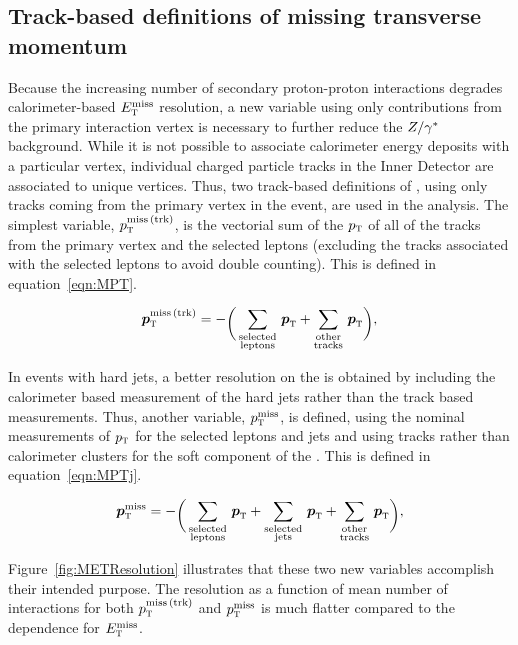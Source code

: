 \subsection{Track-based definitions of missing transverse momentum}

Because the increasing number of secondary proton-proton interactions degrades calorimeter-based $E_{\textrm{\footnotesize\sc t}}^{\rm miss}$ resolution, a new variable using only contributions from the primary interaction vertex is necessary to further reduce the $Z/\gamma^{\ast}$ background. While it is not possible to associate calorimeter energy deposits with a particular vertex, individual charged particle tracks in the Inner Detector are associated to unique vertices. Thus, two track-based definitions of \met, using only tracks coming from the primary vertex in the event, are used in the analysis. The simplest variable, $p_{\textrm{\footnotesize\sc t}}^{\rm miss\,(trk)}$, is the vectorial sum of the $p_{\textrm{\footnotesize\sc t}}$ of all of the tracks from the primary vertex and the selected leptons (excluding the tracks associated with the selected leptons to avoid double counting). This is defined in equation~\ref{eqn:MPT}.

\begin{equation}
\vMPT = -\raisebox{-3.0pt}{\bigg(}%
     \displaystyle
     \sum_{\substack{\rm selected \\ \rm leptons}}\,\vpT
   + \sum_{\substack{\rm other \\ \rm tracks}}\,\vpT
   \raisebox{-3.0pt}{\bigg)},
\label{eqn:MPT}
\end{equation} 

In events with hard jets, a better resolution on the \met is obtained by including the calorimeter based measurement of the hard jets rather than the track based measurements. Thus, another variable, $p_{\textrm{\footnotesize\sc t}}^{\rm miss}$, is defined, using the nominal measurements of $p_{\textrm{\footnotesize\sc t}}$ for the selected leptons and jets and using tracks rather than calorimeter clusters for the soft component of the \met. This is defined in equation~\ref{eqn:MPTj}.

\begin{equation}
\vMPTj = -\raisebox{-3.0pt}{\bigg(}%
     \displaystyle
     \sum_{\substack{\rm selected \\ \rm leptons}}\,\vpT
   + \sum_{\substack{\rm selected \\ \rm jets}}\,\vpT
   + \sum_{\substack{\rm other \\ \rm tracks}}\,\vpT
   \raisebox{-3.0pt}{\bigg)},
\label{eqn:MPTj}
\end{equation} 

Figure~\ref{fig:METResolution} illustrates that these two new variables accomplish their intended purpose. The resolution as a function of mean number of interactions for both $p_{\textrm{\footnotesize\sc t}}^{\rm miss\,(trk)}$ and $p_{\textrm{\footnotesize\sc t}}^{\rm miss}$ is much flatter compared to the dependence for $E_{\textrm{\footnotesize\sc t}}^{\rm miss}$. 

